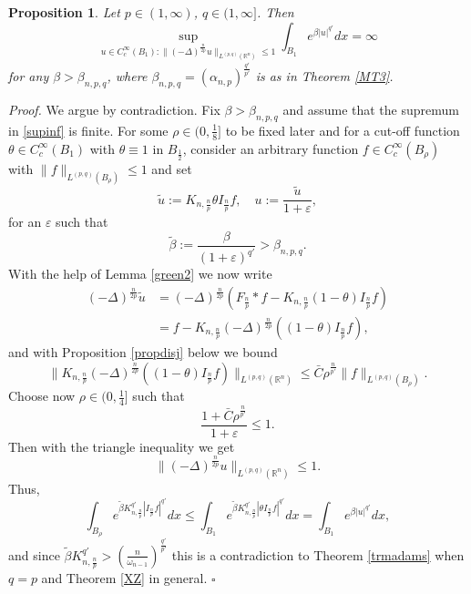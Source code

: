 \documentclass[11pt, a4paper]{article}
\newtheorem{prop}[trm]{Proposition}
\newcommand{\R}{\mathbb{R}}
\newenvironment{proof}{\noindent\emph{Proof.}}{\phantom{ } \hfill$\square$\medskip}
\newcommand{\vrac}[1]{\| #1 \|}
\newcommand{\eps}{\varepsilon}
\begin{document}
\begin{prop}\label{sharp}
Let $p\in (1,\infty)$, $q\in (1,\infty]$. Then 
\begin{equation}\label{supinf}
 \sup_{u\in C^\infty_c(B_1): \|(-\Delta)^\frac{n}{2p}u\|_{L^{(p,q)}(\R^n)}\le 1} \int_{B_1} e^{\beta |u|^{q'}} dx= \infty
\end{equation}
for any $\beta>\beta_{n,p,q}$, where $\beta_{n,p,q}=(\alpha_{n,p})^\frac{q'}{p'}$ is as in Theorem \ref{MT3}.
\end{prop}
\begin{proof} %
We argue by contradiction. Fix $\beta > \beta_{n,p,q}$ and assume that the supremum in \eqref{supinf} is finite.
For some $\rho\in (0,\frac18]$ to be fixed later and for a cut-off function $\theta\in C^\infty_c(B_1)$ with $\theta\equiv 1$ in $B_\frac12$, consider an arbitrary function $f \in C^\infty_c(B_\rho)$ with $\vrac{f}_{L^{(p,q)}(B_\rho)} \leq 1$ and set
$$\tilde{u} :=K_{n,\frac np} \theta I_{\frac np} f,\quad u := \frac{\tilde{u}}{1+\eps},$$
for an $\eps$ such that
$$\tilde \beta := \frac{\beta}{(1+\eps)^{q'}} > \beta_{n,p,q}.$$
With the help of Lemma \ref{green2} we now write
\[\begin{split}
(-\Delta)^\frac{n}{2p} \tilde{u} &= (-\Delta)^\frac{n}{2p}(F_\frac{n}{p}* f- K_{n,\frac np}(1-\theta)I_{\frac np} f)\\
&= f - K_{n,\frac np}(-\Delta)^\frac{n}{2p} ((1-\theta)I_{\frac np} f),
\end{split}
\]
and with Proposition \ref{propdisj} below we bound
\[
 \|K_{n,\frac np} (-\Delta)^\frac{n}{2p} ((1-\theta)I_{\frac np} f)\|_{L^{(p,q)}(\R^n)} \leq \bar C \rho^{\frac n{p'}} \vrac{f}_{L^{(p,q)}(B_\rho)}.
\]
Choose now $\rho\in (0,\frac14]$ such that
$$\frac{1+\bar C\rho^{\frac{n}{p'}}}{1+\eps}\le 1.$$
Then with the triangle inequality we get
$$\|(-\Delta)^\frac{n}{2p} u\|_{L^{(p,q)}(\R^n)} \leq 1.$$
Thus,
\[
 \int_{B_\rho} e^{\tilde \beta K_{n,\frac np}^{q'}|I_{\frac np}f|^{q'}}dx \leq \int_{B_1} e^{\tilde \beta K_{n,\frac np}^{q'} |\theta I_{\frac np}f|^{q'}} dx =\int_{B_1} e^{\beta |u|^{q'}}dx,
 \]
 and since $\tilde \beta K_{n,\frac np}^{q'}> \left(\frac{n}{\omega_{n-1}}\right)^\frac{q'}{p'}$ this is a contradiction to Theorem \ref{trmadams} when $q=p$ and Theorem \ref{XZ} in general.
\end{proof}
\end{document}
